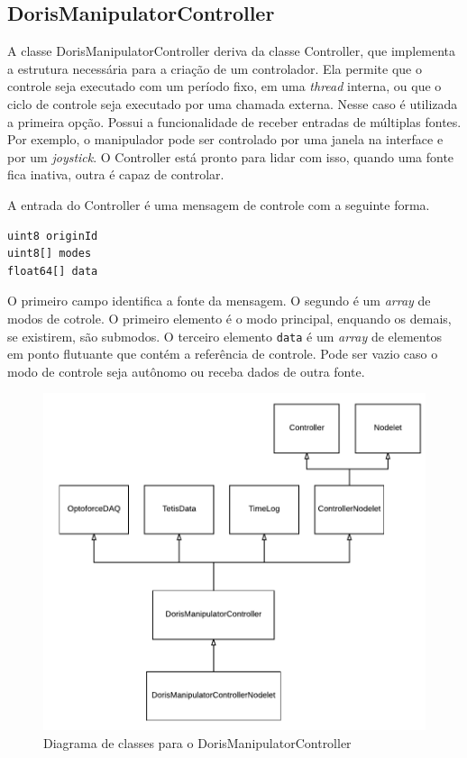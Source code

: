\subsection{DorisManipulatorController}

A classe DorisManipulatorController deriva da classe Controller, que implementa a estrutura necessária para a criação de um controlador. Ela permite que o controle seja executado com um período fixo, em uma \textit{thread} interna, ou que o ciclo de controle seja executado por uma chamada externa. Nesse caso é utilizada a primeira opção. Possui a funcionalidade de receber entradas de múltiplas fontes. Por exemplo, o manipulador pode ser controlado por uma janela na interface e por um \textit{joystick}. O Controller está pronto para lidar com isso, quando uma fonte fica inativa, outra é capaz de controlar. 

A entrada do Controller é uma mensagem de controle com a seguinte forma.

\begin{lstlisting}[caption=Control.msg]
uint8 originId
uint8[] modes
float64[] data
\end{lstlisting}

O primeiro campo identifica a fonte da mensagem. O segundo é um \textit{array} de modos de cotrole. O primeiro elemento é o modo principal, enquando os demais, se existirem, são submodos. O terceiro elemento \verb|data| é um \textit{array} de elementos em ponto flutuante que contém a referência de controle. Pode ser vazio caso o modo de controle seja autônomo ou receba dados de outra fonte.

\begin{figure}[!h]
  \centering
  \includegraphics[width=0.9\linewidth]{./img/class_diagram}
  \caption{Diagrama de classes para o DorisManipulatorController}
  \label{fig:classes}
\end{figure}

